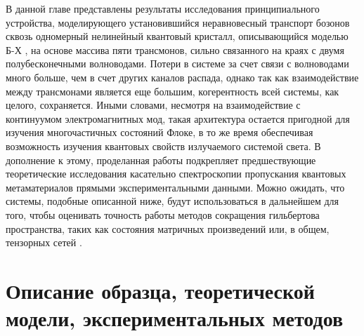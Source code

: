 \documentclass[14pt, a4paper]{extreport}
\numberwithin{equation}{section}
\begin{document}
В данной главе представлены результаты исследования принципиального устройства, моделирующего установившийся неравновесный транспорт бозонов сквозь одномерный нелинейный квантовый кристалл, описывающийся моделью Б-Х \cite{leib2010bose, Biella2015, mertz2016photonic, bychek2020open}, на основе массива пяти трансмонов, сильно связанного на краях с двумя полубесконечными волноводами. Потери в системе за счет связи с волноводами много больше, чем в счет других каналов распада, однако так как взаимодействие между трансмонами является еще большим, когерентность всей системы, как целого, сохраняется. Иными словами, несмотря на взаимодействие с континуумом электромагнитных мод, такая архитектура остается пригодной для изучения многочастичных состояний Флоке, в то же время обеспечивая возможность изучения квантовых свойств излучаемого системой света. В дополнение к этому, проделанная работы подкрепляет предшествующие теоретические исследования касательно спектроскопии пропускания квантовых метаматериалов \cite{Zagoskin2016, viehmann2013observing, Greenberg2015, Fistul2019,roberts2020driven,tiwari2020interplay} прямыми экспериментальными данными. Можно ожидать, что системы, подобные описанной ниже, будут использоваться в дальнейшем для того, чтобы оценивать точность работы методов сокращения гильбертова пространства, таких как состояния матричных произведений или, в общем, тензорных сетей \cite{Biella2015, orell2019probing, di2019efficient}.

\section{Описание образца, теоретической модели, экспериментальных методов}
\end{document}

